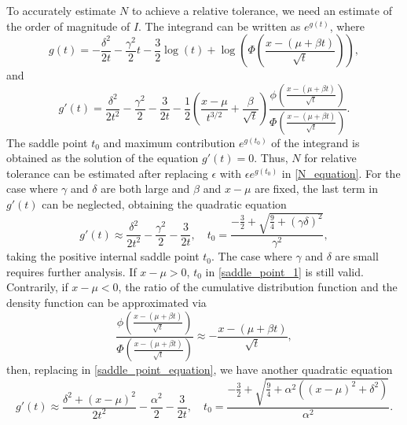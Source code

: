 \documentclass[10pt,a4paper,oneside]{article}
\numberwithin{equation}{section}
\begin{document}
To accurately estimate $N$ to achieve a relative tolerance, we need an estimate of the order of magnitude of $I$. The integrand can be written as $e^{g(t)}$, where
\begin{equation}
g(t) = -\frac{\delta^2}{2t} - \frac{\gamma^2}{2}t - \frac{3}{2}\log(t) + \log\left(\Phi\left(\frac{x - (\mu +\beta t)}{\sqrt{t}}\right)\right),
\end{equation}
and
\begin{equation}\label{saddle_point_equation}
g'(t) = \frac{\delta^2}{2t^2} -\frac{\gamma^2}{2} -\frac{3}{2t} -\frac{1}{2}\left(\frac{x-\mu}{t^{3/2}} + \frac{\beta}{\sqrt{t}} \right)\frac{\phi\left(\frac{x - (\mu +\beta t)}{\sqrt{t}}\right)}{\Phi\left(\frac{x - (\mu +\beta t)}{\sqrt{t}}\right)}.
\end{equation}
The saddle point $t_0$ and maximum contribution $e^{g(t_0)}$ of the integrand is obtained as the solution of the equation $g'(t) = 0$. Thus, $N$ for relative tolerance can be estimated after replacing $\epsilon$ with $\epsilon e^{g(t_0)}$ in \eqref{N_equation}. For the case where $\gamma$ and $\delta$ are both large and $\beta$ and $x-\mu$ are fixed, the last term in $g'(t)$ can be neglected, obtaining the quadratic equation
\begin{equation}\label{saddle_point_1}
g'(t) \approx \frac{\delta^2}{2t^2} -\frac{\gamma^2}{2} -\frac{3}{2t}, \quad t_0 = \frac{-\frac{3}{2} + \sqrt{\frac{9}{4} + (\gamma \delta)^2}}{\gamma^2},
\end{equation}
taking the positive internal saddle point $t_0$. The case where $\gamma$ and $\delta$ are small requires further analysis. If $x-\mu > 0$, $t_0$ in \eqref{saddle_point_1} is still valid. Contrarily, if $x -\mu < 0$, the ratio of the cumulative distribution function and the density function can be approximated via
\begin{equation*}
\frac{\phi\left(\frac{x - (\mu+ \beta t)}{\sqrt{t}}\right)}{\Phi\left(\frac{x - (\mu + \beta t)}{\sqrt{t}}\right)} \approx -\frac{x - (\mu + \beta t)}{\sqrt{t}},
\end{equation*}
then, replacing in \eqref{saddle_point_equation}, we have another quadratic equation
\begin{equation}\label{saddle_point_2}
g'(t) \approx \frac{\delta^2 + (x-\mu)^2}{2t^2} -\frac{\alpha^2}{2} -\frac{3}{2t}, \quad t_0 = \frac{-\frac{3}{2} + \sqrt{\frac{9}{4} + \alpha^2 \left((x-\mu)^2 + \delta^2\right)}}{\alpha^2}.
\end{equation}
\end{document}
